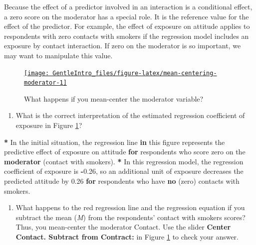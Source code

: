 \documentclass[a4paper]{book}
\newenvironment{Shaded}{\begin{snugshade}}{\end{snugshade}}
\newcommand{\KeywordTok}[1]{\textcolor[rgb]{0,0,0}{\textbf{#1}}}
\newcommand{\FloatTok}[1]{\textcolor[rgb]{0.00,0.00,0.00}{#1}}
\newcommand{\StringTok}[1]{\textcolor[rgb]{0.00,0.00,0.00}{#1}}
\newcommand{\ControlFlowTok}[1]{\textcolor[rgb]{0.00,0.00,0.00}{\textbf{#1}}}
\newcommand{\OperatorTok}[1]{\textcolor[rgb]{0.00,0.00,0.00}{\textbf{#1}}}
\newcommand{\NormalTok}[1]{#1}
\providecommand{\tightlist}{%
  \setlength{\itemsep}{0pt}\setlength{\parskip}{0pt}}
\theoremstyle{definition}
\theoremstyle{definition}
\theoremstyle{definition}
\theoremstyle{remark}
\begin{document}
Because the effect of a predictor involved in an interaction is a
conditional effect, a zero score on the moderator has a special role. It
is the reference value for the effect of the predictor. For example, the
effect of exposure on attitude applies to respondents with zero contacts
with smokers if the regression model includes an exposure by contact
interaction. If zero on the moderator is so important, we may want to
manipulate this value.

\begin{figure}[H]
\href{http://82.196.4.233:3838/apps/mean-centering-moderator/}{\texttt{[image: GentleIntro\_files/figure-latex/mean-centering-moderator-1]} }\caption{What happens if you mean-center the moderator variable?}\label{fig:mean-centering-moderator}
\end{figure}

\begin{enumerate}
\def\labelenumi{\arabic{enumi}.}
\tightlist
\item
  What is the correct interpretation of the estimated regression
  coefficient of exposure in Figure \ref{fig:mean-centering-moderator}?
\end{enumerate}

\begin{Shaded}
\begin{Highlighting}[]
\OperatorTok{*}\StringTok{ }\NormalTok{In the initial situation, the regression line }\ControlFlowTok{in}\NormalTok{ this figure represents the}
\NormalTok{predictive effect of exposure on attitude }\ControlFlowTok{for}\NormalTok{ respondents who score zero on the}
\KeywordTok{moderator}\NormalTok{ (contact with smokers).}
\OperatorTok{*}\StringTok{ }\NormalTok{In this regression model, the regression coefficient of exposure is }\OperatorTok{-}\FloatTok{0.26}\NormalTok{,}
\NormalTok{so an additional unit of exposure decreases the predicted attitude by }\FloatTok{0.26} \ControlFlowTok{for}
\NormalTok{respondents who have }\KeywordTok{no}\NormalTok{ (zero) contacts with smokers.}
\end{Highlighting}
\end{Shaded}

\begin{enumerate}
\def\labelenumi{\arabic{enumi}.}
\setcounter{enumi}{1}
\tightlist
\item
  What happens to the red regression line and the regression equation if
  you subtract the mean (\emph{M}) from the respondents' contact with
  smokers scores? Thus, you mean-center the moderator Contact. Use the
  slider \textbf{Center Contact. Subtract from Contract:} in Figure
  \ref{fig:mean-centering-moderator} to check your answer.
\end{enumerate}
\end{document}
